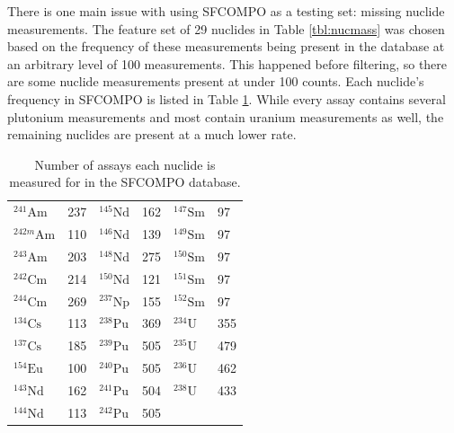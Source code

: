 There is one main issue with using \gls{SFCOMPO} as a testing set: missing
nuclide measurements.  The feature set of 29 nuclides in Table
\ref{tbl:nucmass} was chosen based on the frequency of these measurements being
present in the database at an arbitrary level of 100 measurements. This
happened before filtering, so there are some nuclide measurements present at
under 100 counts.  Each nuclide's frequency in \gls{SFCOMPO} is listed in Table
\ref{tbl:missing}.  While every assay contains several plutonium measurements
and most contain uranium measurements as well, the remaining nuclides are
present at a much lower rate. 

\begin{table}[!htb]
  \centering
  \begin{tabular}{>{\raggedleft}m{0.6in}
                                m{0.4in}
                  >{\raggedleft}m{0.6in}
                                m{0.4in}
                  >{\raggedleft}m{0.6in}
                                m{0.4in}}
    \toprule
    \rowcolor[gray]{0.88} ${}^{241}\text{Am}$  & 237 & ${}^{145}\text{Nd}$ & 162 & ${}^{147}\text{Sm}$ & 97  \\  
    \rowcolor[gray]{0.95} ${}^{242m}\text{Am}$ & 110 & ${}^{146}\text{Nd}$ & 139 & ${}^{149}\text{Sm}$ & 97  \\ 
    \rowcolor[gray]{0.88} ${}^{243}\text{Am}$  & 203 & ${}^{148}\text{Nd}$ & 275 & ${}^{150}\text{Sm}$ & 97  \\ 
    \rowcolor[gray]{0.95} ${}^{242}\text{Cm}$  & 214 & ${}^{150}\text{Nd}$ & 121 & ${}^{151}\text{Sm}$ & 97  \\ 
    \rowcolor[gray]{0.88} ${}^{244}\text{Cm}$  & 269 & ${}^{237}\text{Np}$ & 155 & ${}^{152}\text{Sm}$ & 97  \\ 
    \rowcolor[gray]{0.95} ${}^{134}\text{Cs}$  & 113 & ${}^{238}\text{Pu}$ & 369 & ${}^{234}\text{U}$  & 355 \\ 
    \rowcolor[gray]{0.88} ${}^{137}\text{Cs}$  & 185 & ${}^{239}\text{Pu}$ & 505 & ${}^{235}\text{U}$  & 479 \\ 
    \rowcolor[gray]{0.95} ${}^{154}\text{Eu}$  & 100 & ${}^{240}\text{Pu}$ & 505 & ${}^{236}\text{U}$  & 462 \\ 
    \rowcolor[gray]{0.88} ${}^{143}\text{Nd}$  & 162 & ${}^{241}\text{Pu}$ & 504 & ${}^{238}\text{U}$  & 433 \\ 
    \rowcolor[gray]{0.95} ${}^{144}\text{Nd}$  & 113 & ${}^{242}\text{Pu}$ & 505 &       &     \\ \bottomrule
  \end{tabular}
  \caption[Number of assays each nuclide is measured for in \acrshort{SFCOMPO}]
          {Number of assays each nuclide is measured for in the 
           \acrshort{SFCOMPO} database.}
  \label{tbl:missing}
\end{table}

